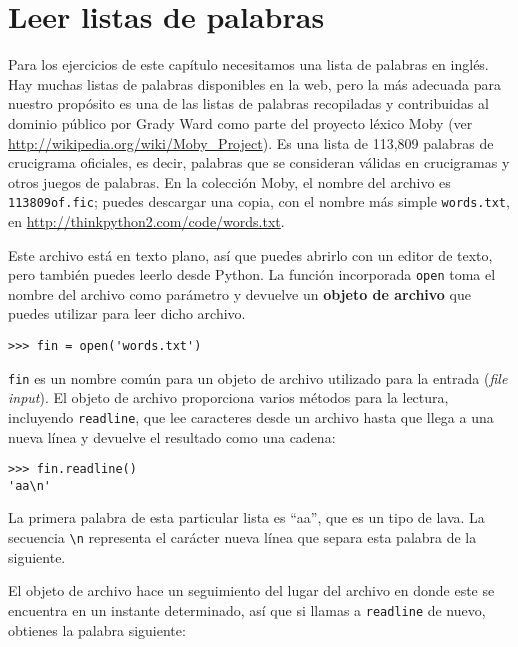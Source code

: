 \documentclass[10pt]{book}
\begin{document}
\section{Leer listas de palabras}
\label{wordlist}

Para los ejercicios de este capítulo necesitamos una lista de palabras en inglés.
Hay muchas listas de palabras disponibles en la web, pero la más
adecuada para nuestro propósito es una de las listas de palabras recopiladas y
contribuidas al dominio público por Grady Ward como parte del proyecto léxico Moby
(ver \url{http://wikipedia.org/wiki/Moby_Project}).  Es
una lista de 113,809 palabras de crucigrama oficiales, es decir, palabras que se
consideran válidas en crucigramas y otros juegos de palabras.  En la
colección Moby, el nombre del archivo es {\tt 113809of.fic}; puedes descargar
una copia, con el nombre más simple {\tt words.txt}, en
\url{http://thinkpython2.com/code/words.txt}.

Este archivo está en texto plano, así que puedes abrirlo con un editor
de texto, pero también puedes leerlo desde Python.  La función incorporada
{\tt open} toma el nombre del archivo como parámetro
y devuelve un {\bf objeto de archivo} que puedes utilizar para leer dicho archivo.


\begin{verbatim}
>>> fin = open('words.txt')
\end{verbatim}
%
{\tt fin} es un nombre común para un objeto de archivo utilizado para la entrada ({\em file input}).  El objeto
de archivo proporciona varios métodos para la lectura, incluyendo {\tt readline},
que lee caracteres desde un archivo hasta que llega a una nueva línea y
devuelve el resultado como una cadena: 

\begin{verbatim}
>>> fin.readline()
'aa\n'
\end{verbatim}
%
La primera palabra de esta particular lista es ``aa'', que es un tipo de
lava.  La secuencia \verb"\n" representa el carácter nueva línea que
separa esta palabra de la siguiente.

El objeto de archivo hace un seguimiento del lugar del archivo en donde este se encuentra en un instante determinado, así que
si llamas a {\tt readline} de nuevo, obtienes la palabra siguiente:
\end{document}
